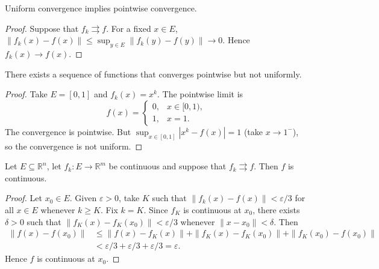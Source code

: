 \begin{proposition}\label{prop:uniform_implies_pointwise}
Uniform convergence implies pointwise convergence.
\end{proposition}

\begin{proof}
Suppose that $f_k \rightrightarrows f$. For a fixed $x \in E$, $\|f_k(x) - f(x)\| \le \sup_{y \in E} \|f_k(y) - f(y)\| \to 0$. Hence $f_k(x) \to f(x)$.
\end{proof}

\begin{proposition}\label{prop:uniform_vs_pointwise}
There exists a sequence of functions that converges pointwise but not uniformly.
\end{proposition}

\begin{proof}
Take $E = [0, 1]$ and $f_k(x) = x^k$. The pointwise limit is
\[
f(x) = \begin{cases} 0, & x \in [0, 1), \\ 1, & x = 1. \end{cases}
\]
The convergence is pointwise. But $\sup_{x \in [0,1]} |x^k - f(x)| = 1$ (take $x \to 1^-$), so the convergence is not uniform.
\end{proof}

\begin{theorem}\label{thm:uniform_continuity_preservation}
Let $E \subseteq \mathbb{R}^n$, let $f_k: E \to \mathbb{R}^m$ be continuous and suppose that $f_k \rightrightarrows f$. Then $f$ is continuous.
\end{theorem}

\begin{proof}
Let $x_0 \in E$. Given $\varepsilon > 0$, take $K$ such that $\|f_k(x) - f(x)\| < \varepsilon/3$ for all $x \in E$ whenever $k \ge K$. Fix $k = K$. Since $f_K$ is continuous at $x_0$, there exists $\delta > 0$ such that $\|f_K(x) - f_K(x_0)\| < \varepsilon/3$ whenever $\|x - x_0\| < \delta$. Then
\[
\begin{aligned}
\|f(x) - f(x_0)\| &\le \|f(x) - f_K(x)\| + \|f_K(x) - f_K(x_0)\| + \|f_K(x_0) - f(x_0)\|\\
&< \varepsilon/3 + \varepsilon/3 + \varepsilon/3 = \varepsilon.
\end{aligned}
\]
Hence $f$ is continuous at $x_0$.
\end{proof}

